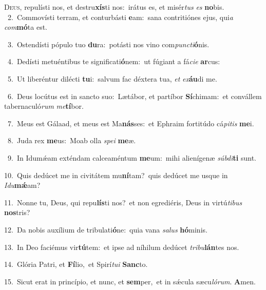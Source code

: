 \lettrine{\initial\textcolor{\initialcolor}{D}}{eus,} repulísti nos, et destru\-\textbf{xís}\-ti nos:~\star irátus es, et misér\textit{tus} \textit{es} \textbf{no}\-bis.\\
{\numbfont\textcolor{\numbcolor}{~2.}}~Commovísti terram, et conturbásti \textbf{e}\-am:~\star sana contritiónes ejus, qui\textit{a} \textit{com}\-\textbf{mó}ta est.\par
{\numbfont\textcolor{\numbcolor}{~3.}}~Ostendísti pópulo tuo \textbf{du}\-ra:~\star potásti nos vino com\-\textit{punc}\-\textit{ti}\textbf{ó}nis.\par
{\numbfont\textcolor{\numbcolor}{~4.}}~Dedísti metuéntibus te significati\-\textbf{ó}\-nem:~\star ut fúgiant a fá\-\textit{ci}\-\textit{e} \textbf{ar}\-cus:\par
{\numbfont\textcolor{\numbcolor}{~5.}}~Ut liberéntur dilécti \textbf{tu}\-i:~\star salvum fac déxtera tua, \textit{et} \textit{ex}\-\textbf{áu}di me.\par
{\numbfont\textcolor{\numbcolor}{~6.}}~Deus locútus est in sancto suo:~\dagger Lætábor, et partíbor \textbf{Sí}\-chimam:~\star et convállem tabernaculó\textit{rum} \textit{me}\-\textbf{tí}bor.\par
{\numbfont\textcolor{\numbcolor}{~7.}}~Meus est Gálaad, et meus est Ma\-\textbf{nás}\-ses:~\star et Ephraim fortitúdo cá\-\textit{pi}\-\textit{tis} \textbf{me}\-i.\par
{\numbfont\textcolor{\numbcolor}{~8.}}~Juda rex \textbf{me}\-us:~\star Moab olla \textit{spe}\-\textit{i} \textbf{me}\-æ.\par
{\numbfont\textcolor{\numbcolor}{~9.}}~In Idumǽam exténdam calceaméntum \textbf{me}\-um:~\star mihi alienígenæ \textit{súb}\-\textit{di}\textbf{ti} sunt.\par
{\numbfont\textcolor{\numbcolor}{10.}}~Quis dedúcet me in civitátem mu\-\textbf{ní}\-tam?~\star quis dedúcet me usque in \textit{I}\-\textit{du}\textbf{mǽ}am?\par
{\numbfont\textcolor{\numbcolor}{11.}}~Nonne tu, Deus, qui repu\-\textbf{lís}\-ti nos?~\star et non egrediéris, Deus in virtú\-\textit{ti}\-\textit{bus} \textbf{nos}\-tris?\par
{\numbfont\textcolor{\numbcolor}{12.}}~Da nobis auxílium de tribulati\-\textbf{ó}\-ne:~\star quia vana \textit{sa}\-\textit{lus} \textbf{hó}\-minis.\par
{\numbfont\textcolor{\numbcolor}{13.}}~In Deo faciémus vir\-\textbf{tú}\-tem:~\star et ipse ad níhilum dedúcet \textit{tri}\-\textit{bu}\textbf{lán}tes nos.\par
{\numbfont\textcolor{\numbcolor}{14.}}~Glória Patri, et \textbf{Fí}\-lio,~\star et Spirí\-\textit{tu}\-\textit{i} \textbf{Sanc}\-to.\par
{\numbfont\textcolor{\numbcolor}{15.}}~Sicut erat in princípio, et nunc, et \textbf{sem}\-per,~\star et in sǽcula sæcu\-\textit{ló}\-\textit{rum}. \textbf{A}\-men.\par
